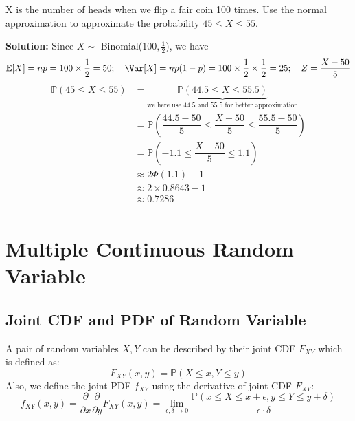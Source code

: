 \begin{eg}
    X is the number of heads when we flip a fair coin 100 times. Use the normal approximation to approximate the probability \(45 \leq X \leq 55\). 

    \textbf{Solution:} 
    Since \(X \sim\) Binomial(\(100, \frac{1}{2}\)), we have 
    \[
        \mathbb{E}[X] = np = 100 \times \dfrac{1}{2} = 50;\quad \Var[X] = np(1 - p) = 100 \times \dfrac{1}{2} \times \dfrac{1}{2} = 25;\quad Z = \dfrac{X - 50}{5}
    \]
    \[
    \begin{aligned}
        \mathbb{P}(45 \leq X \leq 55) &= \underbrace{\mathbb{P}(44.5 \leq X \leq 55.5)}_{\text{we here use 44.5 and 55.5 for better approximation}} \\
        &= \mathbb{P}(\dfrac{44.5 - 50}{5} \leq \dfrac{X - 50}{5} \leq \dfrac{55.5 - 50}{5}) \\
         &= \mathbb{P}(-1.1 \leq \dfrac{X - 50}{5} \leq 1.1) \\
         &\approx 2\varPhi (1.1) - 1 \\
         &\approx 2 \times 0.8643 - 1 \\
         &\approx 0.7286 \\
    \end{aligned}
    \]
\end{eg}

\section{Multiple Continuous Random Variable}

\subsection{Joint CDF and PDF of Random Variable}
\begin{definition}
    A pair of random variables \(X, Y\) can be described by their joint CDF \(F_{XY}\) which is defined as:
    \[
        F_{XY}(x, y) = \mathbb{P}(X \leq x, Y \leq y)
    \]
    Also, we define the joint PDF \(f_{XY}\) using the derivative of joint CDF \(F_{XY}\): 
    \[
        f_{XY}(x, y) = \frac{\partial}{\partial x} \frac{\partial}{\partial y} F_{XY}(x, y) = \lim_{\epsilon, \delta \to 0} \dfrac{\mathbb{P}(x \leq X \leq x + \epsilon, y \leq Y \leq y + \delta)}{\epsilon \cdot \delta} 
    \] 
\end{definition}

